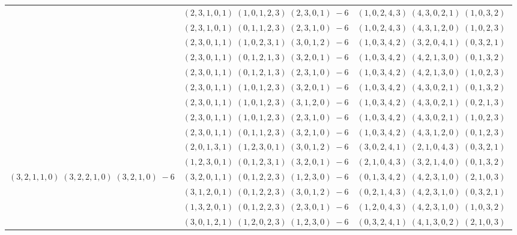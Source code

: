 \documentclass[11pt]{article}
\begin{document}
\begin{longtable}[l]{|c|c|c|}
 \cline{2-3} 
 & $(2 ,3 ,1 ,0 ,1) \;(1 ,0 ,1 ,2 ,3) \;(2 ,3 ,0 ,1) \;-6$ & $(1 ,0 ,2 ,4 ,3) \;(4 ,3 ,0 ,2 ,1) \;(1 ,0 ,3 ,2) \;$\\ 
 \cline{2-3} 
 & $(2 ,3 ,1 ,0 ,1) \;(0 ,1 ,1 ,2 ,3) \;(2 ,3 ,1 ,0) \;-6$ & $(1 ,0 ,2 ,4 ,3) \;(4 ,3 ,1 ,2 ,0) \;(1 ,0 ,2 ,3) \;$\\ 
 \cline{2-3} 
 & $(2 ,3 ,0 ,1 ,1) \;(1 ,0 ,2 ,3 ,1) \;(3 ,0 ,1 ,2) \;-6$ & $(1 ,0 ,3 ,4 ,2) \;(3 ,2 ,0 ,4 ,1) \;(0 ,3 ,2 ,1) \;$\\ 
 \cline{2-3} 
 & $(2 ,3 ,0 ,1 ,1) \;(0 ,1 ,2 ,1 ,3) \;(3 ,2 ,0 ,1) \;-6$ & $(1 ,0 ,3 ,4 ,2) \;(4 ,2 ,1 ,3 ,0) \;(0 ,1 ,3 ,2) \;$\\ 
 \cline{2-3} 
 & $(2 ,3 ,0 ,1 ,1) \;(0 ,1 ,2 ,1 ,3) \;(2 ,3 ,1 ,0) \;-6$ & $(1 ,0 ,3 ,4 ,2) \;(4 ,2 ,1 ,3 ,0) \;(1 ,0 ,2 ,3) \;$\\ 
 \cline{2-3} 
 & $(2 ,3 ,0 ,1 ,1) \;(1 ,0 ,1 ,2 ,3) \;(3 ,2 ,0 ,1) \;-6$ & $(1 ,0 ,3 ,4 ,2) \;(4 ,3 ,0 ,2 ,1) \;(0 ,1 ,3 ,2) \;$\\ 
 \cline{2-3} 
 & $(2 ,3 ,0 ,1 ,1) \;(1 ,0 ,1 ,2 ,3) \;(3 ,1 ,2 ,0) \;-6$ & $(1 ,0 ,3 ,4 ,2) \;(4 ,3 ,0 ,2 ,1) \;(0 ,2 ,1 ,3) \;$\\ 
 \cline{2-3} 
 & $(2 ,3 ,0 ,1 ,1) \;(1 ,0 ,1 ,2 ,3) \;(2 ,3 ,1 ,0) \;-6$ & $(1 ,0 ,3 ,4 ,2) \;(4 ,3 ,0 ,2 ,1) \;(1 ,0 ,2 ,3) \;$\\ 
 \cline{2-3} 
 & $(2 ,3 ,0 ,1 ,1) \;(0 ,1 ,1 ,2 ,3) \;(3 ,2 ,1 ,0) \;-6$ & $(1 ,0 ,3 ,4 ,2) \;(4 ,3 ,1 ,2 ,0) \;(0 ,1 ,2 ,3) \;$\\ 
 \cline{2-3} 
 & $(2 ,0 ,1 ,3 ,1) \;(1 ,2 ,3 ,0 ,1) \;(3 ,0 ,1 ,2) \;-6$ & $(3 ,0 ,2 ,4 ,1) \;(2 ,1 ,0 ,4 ,3) \;(0 ,3 ,2 ,1) \;$\\ 
 \cline{2-3} 
 & $(1 ,2 ,3 ,0 ,1) \;(0 ,1 ,2 ,3 ,1) \;(3 ,2 ,0 ,1) \;-6$ & $(2 ,1 ,0 ,4 ,3) \;(3 ,2 ,1 ,4 ,0) \;(0 ,1 ,3 ,2) \;$\\ \hline\multirow[t]{34}{*}{ $(3 ,2 ,1 ,1 ,0) \;(3 ,2 ,2 ,1 ,0) \;(3 ,2 ,1 ,0) \;-6$ }  & $(3 ,2 ,0 ,1 ,1) \;(0 ,1 ,2 ,2 ,3) \;(1 ,2 ,3 ,0) \;-6$ & $(0 ,1 ,3 ,4 ,2) \;(4 ,2 ,3 ,1 ,0) \;(2 ,1 ,0 ,3) \;$\\ 
 \cline{2-3} 
 & $(3 ,1 ,2 ,0 ,1) \;(0 ,1 ,2 ,2 ,3) \;(3 ,0 ,1 ,2) \;-6$ & $(0 ,2 ,1 ,4 ,3) \;(4 ,2 ,3 ,1 ,0) \;(0 ,3 ,2 ,1) \;$\\ 
 \cline{2-3} 
 & $(1 ,3 ,2 ,0 ,1) \;(0 ,1 ,2 ,2 ,3) \;(2 ,3 ,0 ,1) \;-6$ & $(1 ,2 ,0 ,4 ,3) \;(4 ,2 ,3 ,1 ,0) \;(1 ,0 ,3 ,2) \;$\\ 
 \cline{2-3} 
 & $(3 ,0 ,1 ,2 ,1) \;(1 ,2 ,0 ,2 ,3) \;(1 ,2 ,3 ,0) \;-6$ & $(0 ,3 ,2 ,4 ,1) \;(4 ,1 ,3 ,0 ,2) \;(2 ,1 ,0 ,3) \;$\\ 

\end{longtable}
\end{document}
